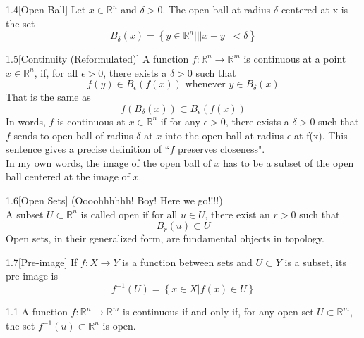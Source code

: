 \begin{customdefinition}{1.4}[Open Ball]
Let $x \in \mathbb{R}^n$ and $\delta > 0$. The open ball at radius $\delta$ centered at x is the set
$$B_\delta (x) = \left\{y \in \mathbb{R}^n \Big| \lvert\lvert x - y\rvert\rvert < \delta\right\}$$
\end{customdefinition}

\begin{customdefinition}{1.5}[Continuity (Reformulated)]
A function $f: \mathbb{R}^n \longrightarrow \mathbb{R}^m$ is continuous at a point $x \in \mathbb{R}^n$, if, for all $\epsilon > 0$, there exists a $\delta > 0$ such that 
    $$f(y) \in B_\epsilon (f(x)) \text{ whenever } y \in B_\delta (x)$$
That is the same as 
    $$f(B_\delta (x)) \subset B_\epsilon (f(x))$$
In words, $f$ is continuous at $x\in \mathbb{R}^n$ if for any $\epsilon > 0$, there exists a $\delta > 0$ such that $f$ sends to open ball of radius $\delta$ at $x$ into the open ball at radius $\epsilon$ at f(x). This sentence gives a precise definition of ``$f$ preserves closeness".\\
In my own words, the image of the open ball of $x$ has to be a subset of the open ball centered at the image of $x$.
\end{customdefinition}

\begin{customdefinition}{1.6}[Open Sets] (Oooohhhhhh! Boy! Here we go!!!!)\\
A subset $U\subset \mathbb{R}^n$ is called open if for all $u \in U$, there exist an $r>0$ such that $$B_r(u) \subset U$$
Open sets, in their generalized form, are fundamental objects in topology.
\end{customdefinition}

\begin{customdefinition}{1.7}[Pre-image] If $f: X \longrightarrow Y$ is a function between sets and $U \subset Y$ is a subset, its pre-image is 
$$f^{-1}(U) = \left\{x\in X \Big| f(x) \in U\right\}$$
\end{customdefinition}

\begin{customthm}{1.1}
A function $f: \mathbb{R}^n \longrightarrow \mathbb{R}^m$ is continuous if and only if, for any open set $U \subset \mathbb{R}^m$, the set $f^{-1}(u) \subset \mathbb{R}^n$ is open.
\end{customthm}

